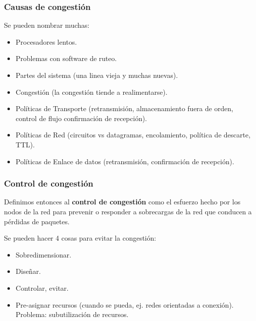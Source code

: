 \documentclass[]{article}
\begin{document}

\subsubsection{Causas de congestión}
Se pueden nombrar muchas:
\begin{itemize}
    \item Procesadores lentos.
    \item Problemas con software de ruteo.
    \item Partes del sistema (una linea vieja y muchas nuevas).
    \item Congestión (la congestión tiende a realimentarse).
    \item Políticas de Transporte (retransmisión, almacenamiento fuera de orden, control de flujo confirmación de recepción).
    \item Políticas de Red (circuitos vs datagramas, encolamiento, política de descarte, TTL).
    \item Políticas de Enlace de datos (retransmisión, confirmación de recepción).
\end{itemize}


\subsubsection{Control de congestión}
Definimos entonces al \textbf{control de congestión} como el esfuerzo hecho por los nodos de la red para prevenir o responder a sobrecargas de la red que conducen a pérdidas de paquetes.

Se pueden hacer 4 cosas para evitar la congestión:
\begin{itemize}
    \item Sobredimensionar.
    \item Diseñar.
    \item Controlar, evitar.
    \item Pre-asignar recursos (cuando se pueda, ej. redes orientadas a conexión). Problema: subutilización de recursos.
\end{itemize}
\end{document}
